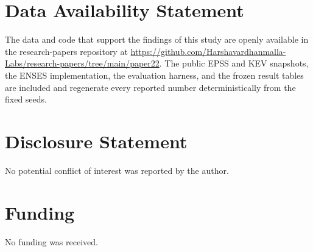 \documentclass[journal]{IEEEtran}
\begin{document}
\section*{Data Availability Statement}
The data and code that support the findings of this study are openly available
in the research-papers repository at
\url{https://github.com/Harshavardhanmalla-Labs/research-papers/tree/main/paper22}.
The public EPSS and KEV snapshots, the ENSES implementation, the evaluation
harness, and the frozen result tables are included and regenerate every reported
number deterministically from the fixed seeds.

\section*{Disclosure Statement}
No potential conflict of interest was reported by the author.

\section*{Funding}
No funding was received.
\end{document}
